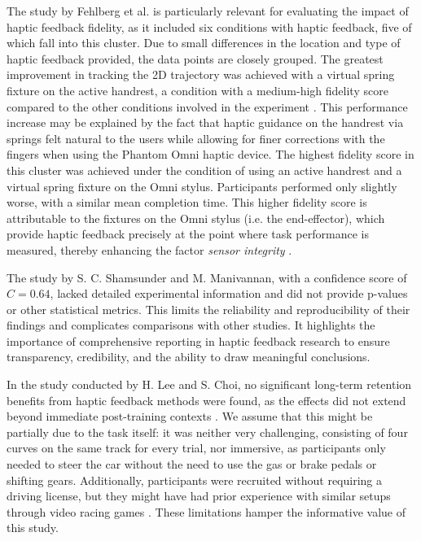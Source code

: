 The study by Fehlberg et al. is particularly relevant for evaluating the impact of haptic feedback fidelity, as it included six conditions with haptic feedback, five of which fall into this cluster. Due to small differences in the location and type of haptic feedback provided, the data points are closely grouped. The greatest improvement in tracking the 2D trajectory was achieved with a virtual spring fixture on the active handrest, a condition with a medium-high fidelity score compared to the other conditions involved in the experiment \cite{Fehlberg2012}. This performance increase may be explained by the fact that haptic guidance on the handrest via springs felt natural to the users while allowing for finer corrections with the fingers when using the Phantom Omni haptic device. The highest fidelity score in this cluster was achieved under the condition of using an active handrest and a virtual spring fixture on the Omni stylus. Participants performed only slightly worse, with a similar mean completion time. This higher fidelity score is attributable to the fixtures on the Omni stylus (i.e. the end-effector), which provide haptic feedback precisely at the point where task performance is measured, thereby enhancing the factor \textit{sensor integrity} \cite{Fehlberg2012}.

The study by S. C. Shamsunder and M. Manivannan, with a confidence score of $C=0.64$, lacked detailed experimental information and did not provide p-values or other statistical metrics. This limits the reliability and reproducibility of their findings and complicates comparisons with other studies. It highlights the importance of comprehensive reporting in haptic feedback research to ensure transparency, credibility, and the ability to draw meaningful conclusions.

In the study conducted by H. Lee and S. Choi, no significant long-term retention benefits from haptic feedback methods were found, as the effects did not extend beyond immediate post-training contexts \cite{LeeH2014}. We assume that this might be partially due to the task itself: it was neither very challenging, consisting of four curves on the same track for every trial, nor immersive, as participants only needed to steer the car without the need to use the gas or brake pedals or shifting gears. Additionally, participants were recruited without requiring a driving license, but they might have had prior experience with similar setups through video racing games \cite{LeeH2014}. These limitations hamper the informative value of this study.

